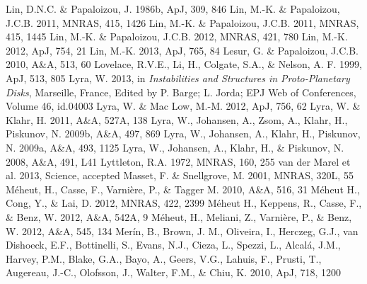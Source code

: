 \documentclass[apj]{emulateapj}
\begin{document}
\begin{thebibliography}{}
 Lin, D.N.C. \& Papaloizou, J. 1986b, ApJ, 309, 846
 Lin, M.-K. \& Papaloizou, J.C.B. 2011, MNRAS, 415, 1426
 Lin, M.-K. \& Papaloizou, J.C.B. 2011, MNRAS, 415, 1445
 Lin, M.-K. \& Papaloizou, J.C.B. 2012, MNRAS, 421, 780
 Lin, M.-K. 2012, ApJ, 754, 21
 Lin, M.-K. 2013, ApJ, 765, 84
 Lesur, G. \& Papaloizou, J.C.B. 2010, A\&A, 513, 60
 Lovelace, R.V.E., Li, H., Colgate, S.A., \& Nelson, A. F. 1999, ApJ, 513, 805
 Lyra, W. 2013, in {\it Instabilities and Structures in Proto-Planetary Disks}, Marseille, France, Edited by P. Barge; L. Jorda; EPJ Web of Conferences, Volume 46, id.04003 
 Lyra, W. \& Mac Low, M.-M. 2012, ApJ, 756, 62
 Lyra, W. \& Klahr,  H. 2011, A\&A, 527A, 138
 Lyra, W., Johansen, A., Zsom, A., Klahr, H., Piskunov, N. 2009b, A\&A, 497, 869
 Lyra, W., Johansen, A., Klahr, H., Piskunov, N. 2009a, A\&A, 493, 1125 
 Lyra, W., Johansen, A., Klahr, H., \& Piskunov, N. 2008, A\&A, 491, L41
 Lyttleton, R.A. 1972, MNRAS, 160, 255
 van der Marel et al. 2013, Science, accepted
 Masset, F. \& Snellgrove, M. 2001, MNRAS, 320L, 55
 M\'eheut, H., Casse, F., Varni\`ere, P., \& Tagger M. 2010, A\&A, 516, 31
 M\'eheut H., Cong, Y., \& Lai, D. 2012, MNRAS, 422, 2399
 M\'eheut H., Keppens,  R., Casse, F., \& Benz, W. 2012, A\&A, 542A, 9
 M\'eheut, H., Meliani, Z., Varni\`ere, P., \& Benz, W. 2012, A\&A, 545, 134
 Mer\'in, B., Brown, J. M., Oliveira, I., Herczeg, G.J., van Dishoeck, E.F., Bottinelli, S., Evans, N.J., Cieza, L., Spezzi, L., Alcal\'a, J.M., Harvey, P.M., Blake, G.A., Bayo, A., Geers, V.G., Lahuis, F., Prusti, T., Augereau, J.-C., Olofsson, J., Walter, F.M., \& Chiu, K. 2010, ApJ, 718, 1200

\end{thebibliography}
\end{document}
